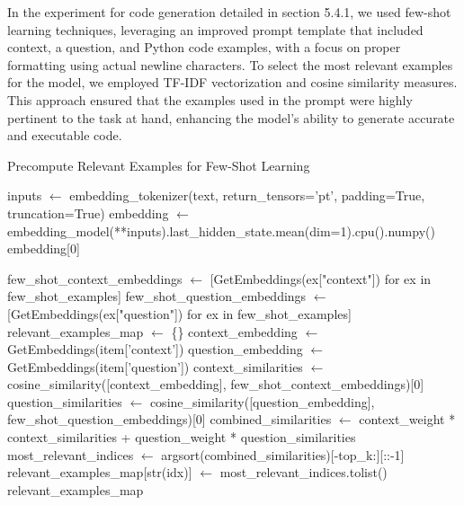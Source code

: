 \documentclass[logo,msc]{infthesis}           %
\begin{document}
In the experiment for code generation detailed in section 5.4.1, we used few-shot learning techniques, leveraging an improved prompt template that included context, a question, and Python code examples, with a focus on proper formatting using actual newline characters.
To select the most relevant examples for the model, we employed TF-IDF vectorization and cosine similarity measures. This approach ensured that the examples used in the prompt were highly pertinent to the task at hand, enhancing the model's ability to generate accurate and executable code.


\begin{algorithm}
\caption{Precompute Relevant Examples for Few-Shot Learning}
\label{alg:precomputeExamples}
\begin{algorithmic}[1]
    \State inputs $\gets$ embedding\_tokenizer(text, return\_tensors='pt', padding=True, truncation=True)
    \State embedding $\gets$ embedding\_model(**inputs).last\_hidden\_state.mean(dim=1).cpu().numpy()
    \State \Return embedding[0]
\EndFunction

    \State few\_shot\_context\_embeddings $\gets$ [GetEmbeddings(ex["context"]) for ex in few\_shot\_examples]
    \State few\_shot\_question\_embeddings $\gets$ [GetEmbeddings(ex["question"]) for ex in few\_shot\_examples]
    \State relevant\_examples\_map $\gets$ \{\}
        \State context\_embedding $\gets$ GetEmbeddings(item['context'])
        \State question\_embedding $\gets$ GetEmbeddings(item['question'])
        \State context\_similarities $\gets$ cosine\_similarity([context\_embedding], few\_shot\_context\_embeddings)[0]
        \State question\_similarities $\gets$ cosine\_similarity([question\_embedding], few\_shot\_question\_embeddings)[0]
        \State combined\_similarities $\gets$ context\_weight * context\_similarities + question\_weight * question\_similarities
        \State most\_relevant\_indices $\gets$ argsort(combined\_similarities)[-top\_k:][::-1]
        \State relevant\_examples\_map[str(idx)] $\gets$ most\_relevant\_indices.tolist()
    \EndFor
    \State \Return relevant\_examples\_map
\EndFunction



\end{algorithmic}
\end{algorithm}
\end{document}
